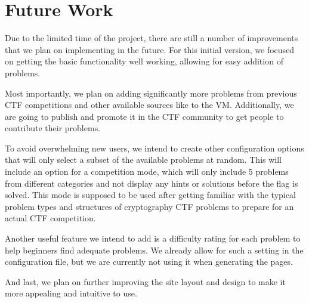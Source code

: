 \section{Future Work} Due to the limited time of the project, there are still a
number of improvements that we plan on implementing in the future. For this
initial version, we focused on getting the basic functionality well working,
allowing for easy addition of problems.

Most importantly, we plan on adding significantly more problems from previous
CTF competitions and other available sources like \cite{ctf:github} to the VM.
Additionally, we are going to publish \cvm{} and promote it in the CTF
community to get people to contribute their problems.

To avoid overwhelming new users, we intend to create other configuration
options that will only select a subset of the available problems at random. This
will include an option for a competition mode, which will only include 5
problems from different categories and not display any hints or solutions before
the flag is solved. This mode is supposed to be used after getting familiar with
the typical problem types and structures of cryptography CTF problems to prepare
for an actual CTF competition.

Another useful feature we intend to add is a difficulty rating for each problem
to help beginners find adequate problems. We already allow for such a setting
in the configuration file, but we are currently not using it when generating
the pages.

And last, we plan on further improving the site layout and design to make it
more appealing and intuitive to use.

